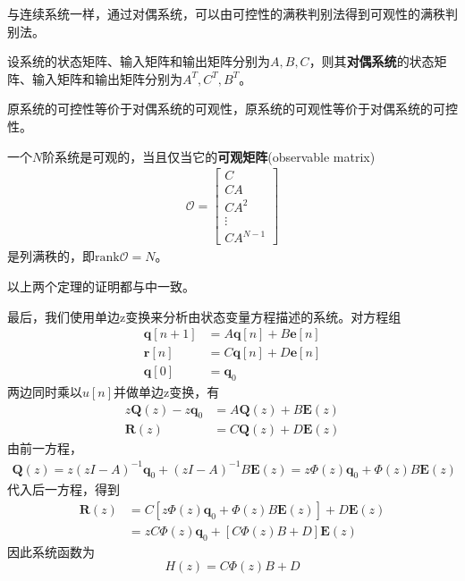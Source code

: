 与连续系统一样，通过对偶系统，可以由可控性的满秩判别法得到可观性的满秩判别法。
\begin{definition}[对偶系统]
    设系统的状态矩阵、输入矩阵和输出矩阵分别为$A,B,C$，则其\textbf{对偶系统}的状态矩阵、输入矩阵和输出矩阵分别为$A^T,C^T,B^T$。
\end{definition}

\begin{theorem}
    原系统的可控性等价于对偶系统的可观性，原系统的可观性等价于对偶系统的可控性。
\end{theorem}

\begin{theorem}[可观性的满秩判别法]
    一个$N$阶系统是可观的，当且仅当它的\textbf{可观矩阵}(observable matrix)
    \begin{align*}
    \mathcal{O} =\begin{bmatrix}
    C\\
    CA\\
    CA^2\\
    \vdots\\
    CA^{N-1}
    \end{bmatrix}
    \end{align*}
    是列满秩的，即$\mathrm{rank}\mathcal{O}=N$。
\end{theorem}

以上两个定理的证明都与中一致。

最后，我们使用单边z变换来分析由状态变量方程描述的系统。对方程组
\begin{align*}
    \mathbf{q}[n+1]&=A\mathbf{q}[n]+B\mathbf{e}[n]\\
    \mathbf{r}[n]&=C\mathbf{q}[n]+D\mathbf{e}[n]\\
    \mathbf{q}[0]&=\mathbf{q}_0
\end{align*}
两边同时乘以$u[n]$并做单边z变换，有\begin{align*}
    z\mathbf{Q}(z)-z\mathbf{q}_0&=A\mathbf{Q}(z)+B\mathbf{E}(z)\\
    \mathbf{R}(z)&=C\mathbf{Q}(z)+D\mathbf{E}(z)
\end{align*}
由前一方程，\begin{align*}
    \mathbf{Q}(z)=z(zI-A)^{-1}\mathbf{q}_0+(zI-A)^{-1}B\mathbf{E}(z)=z\Phi(z)\mathbf{q}_0+\Phi(z)B\mathbf{E}(z)
\end{align*}
代入后一方程，得到\begin{align*}
    \mathbf{R}(z)&=C\left[z\Phi(z)\mathbf{q}_0+\Phi(z)B\mathbf{E}(z)\right]+D\mathbf{E}(z)\\
    &=zC\Phi(z)\mathbf{q}_0+[C\Phi(z)B+D]\mathbf{E}(z)
\end{align*}
因此系统函数为
$$H(z)=C\Phi(z)B+D$$


